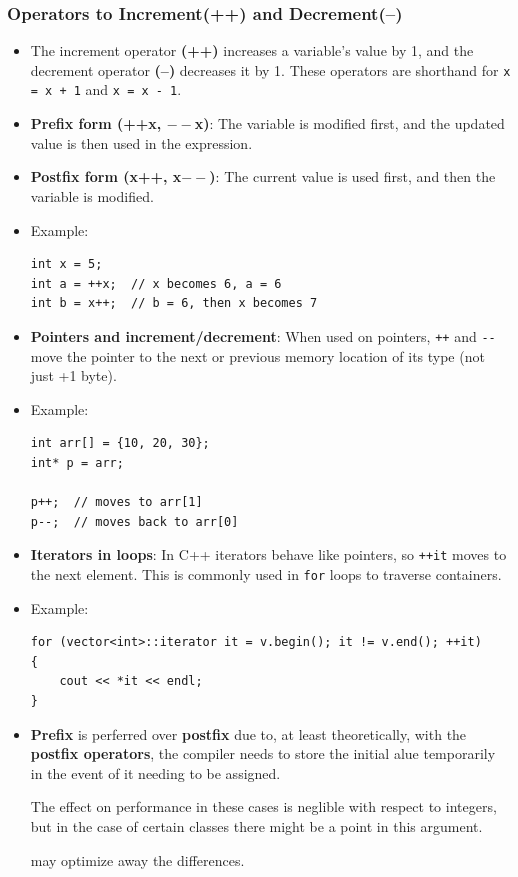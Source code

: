 \documentclass[10pt]{article}
\newcommand{\pbreak}{\vspace{30pt}}
\newcommand{\vocab}[1]{\fbox{\textbf{\textit{#1}}}}
\begin{document}
\newpage 

\subsubsection{Operators to Increment(++) and Decrement(--)}

\begin{itemize}
	\item The increment operator \textbf{(++)} increases a variable’s value by 1, and the decrement operator \textbf{(--)} decreases it by 1. These operators are shorthand for \verb|x = x + 1| and \verb|x = x - 1|.

	\item \textbf{Prefix form (++x, $--$x)}: The variable is modified first, and the updated value is then used in the expression.
	
	\item \textbf{Postfix form (x++, x$--$)}: The current value is used first, and then the variable is modified.

	\item Example:
	\begin{verbatim}
int x = 5;
int a = ++x;  // x becomes 6, a = 6
int b = x++;  // b = 6, then x becomes 7
	\end{verbatim}

	\item \textbf{Pointers and increment/decrement}: When used on pointers, \verb|++| and \verb|--| move the pointer to the next or previous memory location of its type (not just +1 byte).

	\item Example:
	\begin{verbatim}
int arr[] = {10, 20, 30};
int* p = arr;

p++;  // moves to arr[1]
p--;  // moves back to arr[0]
	\end{verbatim}

	\item \textbf{Iterators in loops}: In C++ iterators behave like pointers, so \verb|++it| moves to the next element. This is commonly used in \verb|for| loops to traverse containers.

	\item Example:
	\begin{verbatim}
for (vector<int>::iterator it = v.begin(); it != v.end(); ++it)
{
	cout << *it << endl;
}
	\end{verbatim}

	\pbreak

\item \textbf{Prefix} is perferred over \textbf{postfix} due to, at least theoretically, with the \textbf{postfix operators}, the compiler needs to store the initial alue temporarily in the event of it needing to be assigned.

	The effect on performance in these cases is neglible with respect to integers, but in the case of certain classes there might be a point in this argument.

	\vocab{Smart pointers} may optimize away the differences.
\end{itemize}
\end{document}
